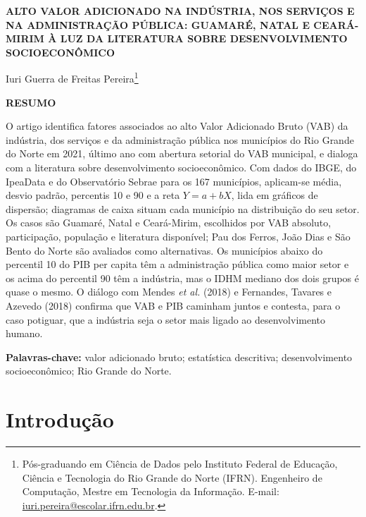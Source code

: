 \documentclass[12pt,a4paper]{article}
\begin{document}
\thispagestyle{empty}
\begin{singlespace}
\begin{center}
\textbf{ALTO VALOR ADICIONADO NA INDÚSTRIA, NOS SERVIÇOS E NA ADMINISTRAÇÃO PÚBLICA: GUAMARÉ, NATAL E CEARÁ-MIRIM À LUZ DA LITERATURA SOBRE DESENVOLVIMENTO SOCIOECONÔMICO}
\end{center}
\vspace{8pt}
\begin{flushright}
Iuri Guerra de Freitas Pereira\footnote{Pós-graduando em Ciência de Dados pelo Instituto Federal de Educação, Ciência e Tecnologia do Rio Grande do Norte (IFRN). Engenheiro de Computação, Mestre em Tecnologia da Informação. E\mbox{-}mail: \url{iuri.pereira@escolar.ifrn.edu.br}.}
\end{flushright}
\vspace{8pt}
\noindent\textbf{RESUMO}

\noindent O artigo identifica fatores associados ao alto Valor Adicionado Bruto (VAB) da indústria, dos serviços e da administração pública nos municípios do Rio Grande do Norte em 2021, último ano com abertura setorial do VAB municipal, e dialoga com a literatura sobre desenvolvimento socioeconômico. Com dados do IBGE, do IpeaData e do Observatório Sebrae para os 167 municípios, aplicam-se média, desvio padrão, percentis 10 e 90 e a reta $Y = a + bX$, lida em gráficos de dispersão; diagramas de caixa situam cada município na distribuição do seu setor. Os casos são Guamaré, Natal e Ceará-Mirim, escolhidos por VAB absoluto, participação, população e literatura disponível; Pau dos Ferros, João Dias e São Bento do Norte são avaliados como alternativas. Os municípios abaixo do percentil 10 do PIB per capita têm a administração pública como maior setor e os acima do percentil 90 têm a indústria, mas o IDHM mediano dos dois grupos é quase o mesmo. O diálogo com Mendes \textit{et al.} (2018) e Fernandes, Tavares e Azevedo (2018) confirma que VAB e PIB caminham juntos e contesta, para o caso potiguar, que a indústria seja o setor mais ligado ao desenvolvimento humano.

\vspace{4pt}
\noindent\textbf{Palavras-chave:} valor adicionado bruto; estatística descritiva; desenvolvimento socioeconômico; Rio Grande do Norte.
\end{singlespace}

\section{Introdução}
\end{document}
